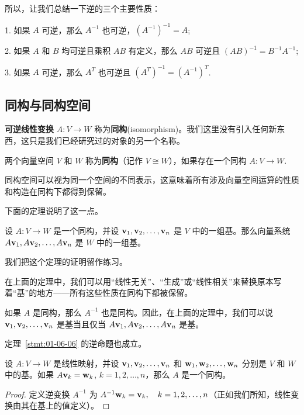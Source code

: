 所以，让我们总结一下逆的三个主要性质：

1. 如果 $A$ 可逆，那么 $A^{-1}$ 也可逆，$(A^{-1})^{-1} = A$;

2. 如果 $A$ 和 $B$ 均可逆且乘积 $AB$ 有定义，那么 $AB$ 可逆且 $(AB)^{-1} = B^{-1} A^{-1}$;

3. 如果 $A$ 可逆，那么 $A^T$ 也可逆且 $(A^T)^{-1} = (A^{-1})^T$.

\subsection{同构与同构空间}\label{sec:01-06-03}

\textbf{可逆线性变换} $A: V \to W$ 称为\textbf{同构}(isomorphism)。我们这里没有引入任何新东西，这只是我们已经研究过的对象的另一个名称。

两个向量空间 $V$ 和 $W$ 称为\textbf{同构}（记作 $V \cong W$），如果存在一个同构 $A: V \to W$.~

同构空间可以视为同一个空间的不同表示，这意味着所有涉及向量空间运算的性质和构造在同构下都得到保留。

下面的定理说明了这一点。

\begin{theorem}\label{stmt:01-06-06} 设 $A: V \to W$ 是一个同构，并设 $\mathbf{v}_1, \mathbf{v}_2, \dots, \mathbf{v}_n$ 是 $V$ 中的一组基。那么向量系统 $A \mathbf{v}_1, A \mathbf{v}_2, \dots, A \mathbf{v}_n$ 是 $W$ 中的一组基。\end{theorem}

我们把这个定理的证明留作练习。

\begin{remark*}
在上面的定理中，我们可以用“线性无关”、“生成”或“线性相关”来替换原本写着“基”的地方——所有这些性质在同构下都被保留。
\end{remark*}

\begin{remark*}
如果 $A$ 是同构，那么 $A^{-1}$ 也是同构。因此，在上面的定理中，我们可以说 $\mathbf{v}_1, \mathbf{v}_2, \dots, \mathbf{v}_n$ 是基当且仅当 $A \mathbf{v}_1, A \mathbf{v}_2, \dots, A \mathbf{v}_n$ 是基。
\end{remark*}

定理~\ref{stmt:01-06-06} 的逆命题也成立。

\begin{theorem}\label{stmt:01-06-07}  设 $A: V \to W$ 是线性映射，并设 $\mathbf{v}_1, \mathbf{v}_2, \dots, \mathbf{v}_n$ 和 $\mathbf{w}_1, \mathbf{w}_2, \dots, \mathbf{w}_n$ 分别是 $V$ 和 $W$ 中的基。如果 $A \mathbf{v}_k = \mathbf{w}_k$, $k = 1, 2, \dots, n$，那么 $A$ 是一个同构。\end{theorem}

\begin{proof} 定义逆变换 $A^{-1}$ 为 $A^{-1} \mathbf{w}_k = \mathbf{v}_k,\quad k = 1, 2, \dots, n$（正如我们所知，线性变换由其在基上的值定义）。\end{proof}

